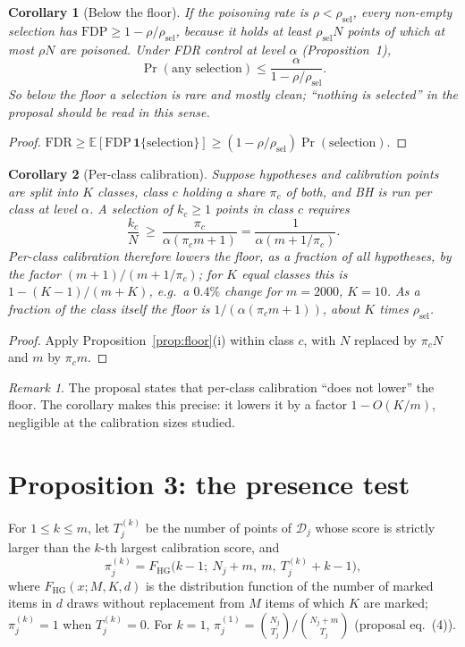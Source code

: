 \documentclass[11pt]{article}
\newtheorem{corollary}{Corollary}
\theoremstyle{definition}
\theoremstyle{remark}
\newtheorem{remark}{Remark}
\newcommand{\D}{\mathcal{D}}
\newcommand{\E}{\mathbb{E}}
\newcommand{\1}{\mathbf{1}}
\begin{document}
\begin{corollary}[Below the floor]
If the poisoning rate is $\rho<\rho_{\mathrm{sel}}$, every non-empty selection has
$\mathrm{FDP}\ge1-\rho/\rho_{\mathrm{sel}}$, because it holds at least $\rho_{\mathrm{sel}}N$ points of
which at most $\rho N$ are poisoned. Under FDR control at level $\alpha$ (Proposition~1),
\[
\Pr(\text{any selection})\le\frac{\alpha}{1-\rho/\rho_{\mathrm{sel}}}.
\]
So below the floor a selection is rare and mostly clean; ``nothing is selected'' in the proposal
should be read in this sense.
\end{corollary}

\begin{proof}
$\mathrm{FDR}\ge\E[\mathrm{FDP}\,\1\{\text{selection}\}]\ge(1-\rho/\rho_{\mathrm{sel}})\Pr(\text{selection})$.
\end{proof}

\begin{corollary}[Per-class calibration]
Suppose hypotheses and calibration points are split into $K$ classes, class $c$ holding a share
$\pi_c$ of both, and BH is run per class at level $\alpha$. A selection of $k_c\ge1$ points in class
$c$ requires
\[
\frac{k_c}{N}\ \ge\ \frac{\pi_c}{\alpha(\pi_cm+1)}=\frac{1}{\alpha(m+1/\pi_c)} .
\]
Per-class calibration therefore lowers the floor, as a fraction of all hypotheses, by the factor
$(m+1)/(m+1/\pi_c)$; for $K$ equal classes this is $1-(K-1)/(m+K)$, e.g.\ a $0.4\%$ change for
$m=2000$, $K=10$. As a fraction of the class itself the floor is $1/(\alpha(\pi_cm+1))$, about $K$
times $\rho_{\mathrm{sel}}$.
\end{corollary}

\begin{proof}
Apply Proposition~\ref{prop:floor}(i) within class $c$, with $N$ replaced by $\pi_cN$ and $m$ by
$\pi_cm$.
\end{proof}

\begin{remark}
The proposal states that per-class calibration ``does not lower'' the floor. The corollary makes
this precise: it lowers it by a factor $1-O(K/m)$, negligible at the calibration sizes studied.
\end{remark}

\section{Proposition 3: the presence test}

For $1\le k\le m$, let $T^{(k)}_j$ be the number of points of $\D_j$ whose score is strictly larger
than the $k$-th largest calibration score, and
\[
\pi^{(k)}_j=F_{\mathrm{HG}}\bigl(k-1;\ N_j+m,\ m,\ T^{(k)}_j+k-1\bigr),
\]
where $F_{\mathrm{HG}}(x;M,K,d)$ is the distribution function of the number of marked items in $d$
draws without replacement from $M$ items of which $K$ are marked; $\pi_j^{(k)}=1$ when
$T^{(k)}_j=0$. For $k=1$, $\pi^{(1)}_j=\binom{N_j}{T_j}\big/\binom{N_j+m}{T_j}$ (proposal eq.~(4)).
\end{document}
